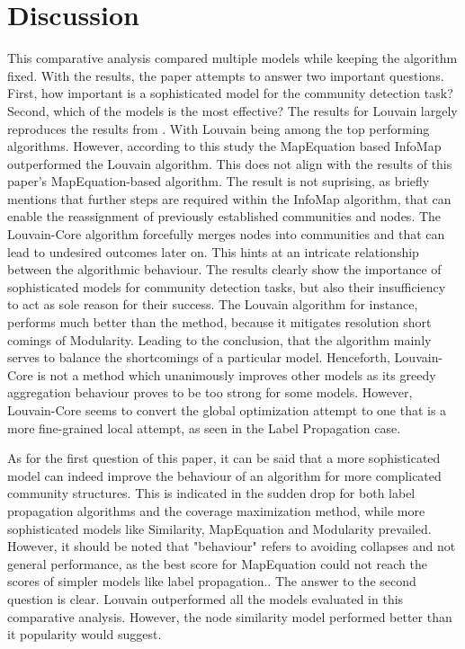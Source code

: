 \documentclass[11pt, twocolumn]{article}
\begin{document}
\section{Discussion}
\label{sec:discussion}
This comparative analysis compared multiple models while keeping the algorithm fixed. With the results, the paper attempts to answer two important questions. First, how important is a sophisticated model for the community detection task? Second, which of the models is the most effective?
The results for Louvain largely reproduces the results from \citeauthor{lancichinetti_CommunityDetectionAlgorithms_2009}. With Louvain being among the top performing algorithms. However, according to this study the MapEquation based InfoMap outperformed the Louvain algorithm. This does not align with the results of this paper's MapEquation-based algorithm. The result is not suprising, as \citeauthor{bohlin_CommunityDetectionVisualization_2014} briefly mentions that further steps are required within the InfoMap algorithm, that can enable the reassignment of previously established communities and nodes. The Louvain-Core algorithm forcefully merges nodes into communities and that can lead to undesired outcomes later on. This hints at an intricate relationship between the algorithmic behaviour. The results clearly show the importance of sophisticated models for community detection tasks, but also their insufficiency to act as sole reason for their success. The Louvain algorithm for instance, performs much better than the \citeauthor{clauset_FindingCommunityStructure_2004} method, because it mitigates resolution short comings of Modularity. Leading to the conclusion, that the algorithm mainly serves to balance the shortcomings of a particular model. Henceforth, Louvain-Core is not a method which unanimously improves other models as its greedy aggregation behaviour proves to be too strong for some models. However, Louvain-Core seems to convert the global optimization attempt to one that is a more fine-grained local attempt, as seen in the Label Propagation case. 

As for the first question of this paper, it can be said that a more sophisticated model can indeed improve the behaviour of an algorithm for more complicated community structures. This is indicated in the sudden drop for both label propagation algorithms and the coverage maximization method, while more sophisticated models like Similarity, MapEquation and Modularity prevailed. However, it should be noted that "behaviour" refers to avoiding collapses and not general performance, as the best score for MapEquation could not reach the scores of simpler models like label propagation..  
The answer to the second question is clear. Louvain outperformed all the models evaluated in this comparative analysis. However, the node similarity model performed better than it popularity would suggest. 
\end{document}
